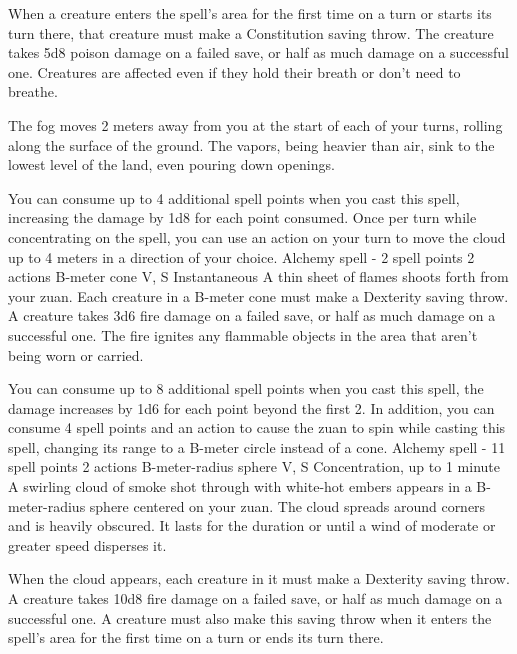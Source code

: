         When a creature enters the spell's area for the first time on a turn or starts its turn there, that creature must make a Constitution saving throw.
        The creature takes 5d8 poison damage on a failed save, or half as much damage on a successful one.
        Creatures are affected even if they hold their breath or don't need to breathe.

        The fog moves 2 meters away from you at the start of each of your turns, rolling along the surface of the ground.
        The vapors, being heavier than air, sink to the lowest level of the land, even pouring down openings.

        You can consume up to 4 additional spell points when you cast this spell, increasing the damage by 1d8 for each point consumed.
        Once per turn while concentrating on the spell, you can use an action on your turn to move the cloud up to 4 meters in a direction of your choice.
        {Alchemy spell - 2 spell points}
        {2 actions}
        {B-meter cone}
        {V, S}
        {Instantaneous}
        A thin sheet of flames shoots forth from your zuan.
        Each creature in a B-meter cone must make a Dexterity saving throw.
        A creature takes 3d6 fire damage on a failed save, or half as much damage on a successful one.
        The fire ignites any flammable objects in the area that aren't being worn or carried.

        You can consume up to 8 additional spell points when you cast this spell, the damage increases by 1d6 for each point beyond the first 2.
        In addition, you can consume 4 spell points and an action to cause the zuan to spin while casting this spell, changing its range to a B-meter circle instead of a cone.
        {Alchemy spell - 11 spell points}
        {2 actions}
        {B-meter-radius sphere}
        {V, S}
        {Concentration, up to 1 minute}
        A swirling cloud of smoke shot through with white-hot embers appears in a B-meter-radius sphere centered on your zuan.
        The cloud spreads around corners and is heavily obscured.
        It lasts for the duration or until a wind of moderate or greater speed disperses it.

        When the cloud appears, each creature in it must make a Dexterity saving throw.
        A creature takes 10d8 fire damage on a failed save, or half as much damage on a successful one.
        A creature must also make this saving throw when it enters the spell's area for the first time on a turn or ends its turn there.

